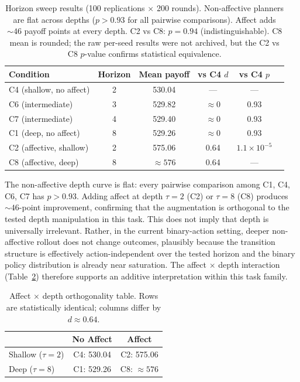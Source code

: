 \documentclass[11pt,a4paper]{article}
\begin{document}
\begin{table}[ht]
\centering\small
\begin{tabular}{lccccc}
\toprule
Condition & Horizon & Mean payoff & vs C4 $d$ & vs C4 $p$ \\
\midrule
C4 (shallow, no affect) & 2 & 530.04 & --- & --- \\
C6 (intermediate) & 3 & 529.82 & $\approx 0$ & 0.93 \\
C7 (intermediate) & 4 & 529.40 & $\approx 0$ & 0.93 \\
C1 (deep, no affect) & 8 & 529.26 & $\approx 0$ & 0.93 \\
\midrule
C2 (affective, shallow) & 2 & 575.06 & 0.64 & $1.1 \times 10^{-5}$ \\
C8 (affective, deep) & 8 & $\approx 576$ & 0.64 & --- \\
\bottomrule
\end{tabular}
\caption{Horizon sweep results (100 replications $\times$ 200 rounds). Non-affective planners are flat across depths ($p > 0.93$ for all pairwise comparisons). Affect adds $\sim\!46$ payoff points at every depth. C2 vs C8: $p = 0.94$ (indistinguishable). C8 mean is rounded; the raw per-seed results were not archived, but the C2 vs C8 $p$-value confirms statistical equivalence.}
\label{tab:horizon}
\end{table}

The non-affective depth curve is flat: every pairwise comparison among C1, C4, C6, C7 has $p > 0.93$. Adding affect at depth $\tau = 2$ (C2) or $\tau = 8$ (C8) produces $\sim\!46$-point improvement, confirming that the augmentation is orthogonal to the tested depth manipulation in this task. This does not imply that depth is universally irrelevant. Rather, in the current binary-action setting, deeper non-affective rollout does not change outcomes, plausibly because the transition structure is effectively action-independent over the tested horizon and the binary policy distribution is already near saturation. The affect $\times$ depth interaction (Table~\ref{tab:orthogonality}) therefore supports an additive interpretation within this task family.

\begin{table}[ht]
\centering
\begin{tabular}{lcc}
\toprule
& No Affect & Affect \\
\midrule
Shallow ($\tau=2$) & C4: 530.04 & C2: 575.06 \\
Deep ($\tau=8$)    & C1: 529.26 & C8: $\approx 576$ \\
\bottomrule
\end{tabular}
\caption{Affect $\times$ depth orthogonality table. Rows are statistically identical; columns differ by $d \approx 0.64$.}
\label{tab:orthogonality}
\end{table}
\end{document}
